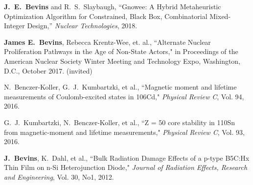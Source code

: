 \begin{bibsection}
  \item \textbf{J.\ E.\ Bevins} and R.\ S.\ Slaybaugh, ``Gnowee: A Hybrid Metaheuristic Optimization Algorithm for Constrained, Black Box, Combinatorial Mixed-Integer Design,” \textit{Nuclear Technologies}, 2018.
  
\item \textbf{James E.\ Bevins}, Rebecca Krentz-Wee, et. al., ``Alternate Nuclear Proliferation Pathways in the Age of Non-State Actors," in Proceedings of the American Nuclear Society Winter Meeting and Technology Expo, Washington, D.C., October 2017. (invited)

  \item N.\ Benczer-Koller, G.\ J.\ Kumbartzki, et al., ``Magnetic moment and lifetime measurements of Coulomb-excited states in 106Cd," \textit{Physical Review C}, Vol. 94, 2016.

  \item G.\ J.\ Kumbartzki, N.\ Benczer-Koller, et al., ``Z = 50 core stability in 110Sn from magnetic-moment and lifetime measurements," \textit{Physical Review C}, Vol. 93, 2016.

\item \textbf{J.\ Bevins}, K.\ Dahl, et al., ``Bulk Radiation Damage Effects of a p-type B5C:Hx Thin Film on n-Si Heterojunction Diode," \textit{Journal of Radiation Effects, Research and Engineering}, Vol. 30, No1, 2012.
  
\end{bibsection}

